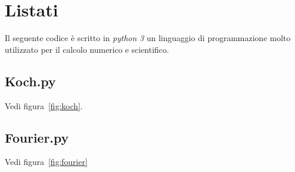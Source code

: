 \chapter{Listati}

Il seguente codice è scritto in \emph{python 3}%
un linguaggio di programmazione
molto utilizzato per il calcolo numerico e scientifico.



\section{Koch.py}

Vedi figura~\ref{fig:koch}.
\label{code:Koch}


\section{Fourier.py}

Vedi figura~\ref{fig:fourier}
\label{code:Fourier}

